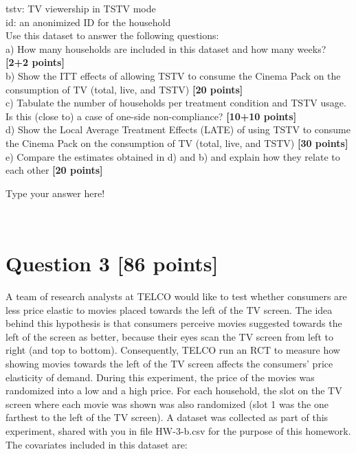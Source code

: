\documentclass{article}
\begin{document}
tstv: TV viewership in TSTV mode\\

id: an anonimized ID for the household\\

Use this dataset to answer the following questions:\\

a) How many households are included in this dataset and how many weeks? {\bf [2+2 points]}\\

b) Show the ITT effects of allowing TSTV to consume the Cinema Pack on the consumption of TV (total, live, and TSTV) {\bf [20 points]}\\

c) Tabulate the number of households per treatment condition and TSTV usage. Is this (close to) a case of one-side non-compliance? {\bf [10+10 points]}\\ 

d) Show the Local Average Treatment Effects (LATE) of using TSTV to consume the Cinema Pack on the consumption of TV (total, live, and TSTV) {\bf [30 points]}\\

e) Compare the estimates obtained in d) and b) and explain how they relate to each other {\bf [20 points]}\\

\vspace{1cm}

{\color{blue}

Type your answer here!
}\\

\section*{\color{black} Question 3 {\bf [86 points]}}

A team of research analysts at TELCO would like to test whether consumers are less price elastic to movies placed towards the left of the TV screen. The idea behind this hypothesis is that consumers perceive movies suggested towards the left of the screen as better, because their eyes scan the TV screen from left to right (and top to bottom). Consequently, TELCO run an RCT to measure how showing movies towards the left of the TV screen affects the consumers' price elasticity of demand. During this experiment, the price of the movies was randomized into a low and a high price. For each household, the slot on the TV screen where each movie was shown was also randomized (slot 1 was the one farthest to the left of the TV screen). A dataset was collected as part of this experiment, shared with you in file HW-3-b.csv for the purpose of this homework. The covariates included in this dataset are:\\
\end{document}
